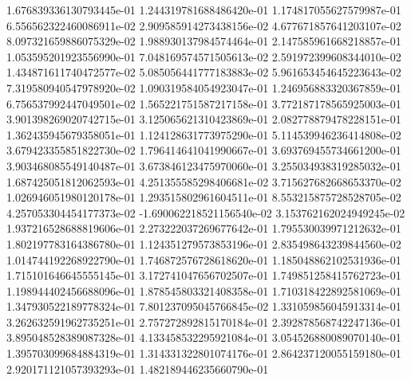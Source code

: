 1.676839336130793445e-01	1.244319781688486420e-01	1.174817055627579987e-01	6.556562322460086911e-02	2.909585914273438156e-02	4.677671857641203107e-02	8.097321659886075329e-02	1.988930137984574464e-01	2.147585961668218857e-01	1.053595201923556990e-01	7.048169574571505613e-02	2.591972399608344010e-02	1.434871611740472577e-02	5.085056441777183883e-02	5.961653454645223643e-02	7.319580940547978920e-02	1.090319584054923047e-01	1.246956883320367859e-01	6.756537992447049501e-02	1.565221751587217158e-01	3.772187178565925003e-01	3.901398269020742715e-01	3.125065621310423869e-01	2.082778879478228151e-01	1.362435945679358051e-01	1.124128631773975290e-01	5.114539946236414808e-02	3.679423355851822730e-02	1.796414641041990667e-01	3.693769455734661200e-01	3.903468085549140487e-01	3.673846123475970060e-01	3.255034938319285032e-01	1.687425051812062593e-01	4.251355585298406681e-02	3.715627682668653370e-02	1.026946051980120178e-01	1.293515802961604511e-01	8.553215875728528705e-02	4.257053304454177373e-02	-1.690062218521156540e-02	3.153762162024949245e-02	1.937216528688819606e-01	2.273222037269677642e-01	1.795530039971212632e-01	1.802197783164386780e-01	1.124351279573853196e-01	2.835498643239844560e-02	1.014744192268922790e-01	1.746872576728618620e-01	1.185048862102531936e-01	1.715101646645555145e-01	3.172741047656702507e-01	1.749851258415762723e-01	1.198944402456688096e-01	1.878545803321408358e-01	1.710318422892581069e-01	1.347930522189778324e-01	7.801237095045766845e-02	1.331059856045913314e-01	3.262632591962735251e-01	2.757272892815170184e-01	2.392878568742247136e-01	3.895048528389087328e-01	4.133458532295921084e-01	3.054526880089070140e-01	1.395703099684884319e-01	1.314331322801074176e-01	2.864237120055159180e-01	2.920171121057393293e-01	1.482189446235660790e-01
